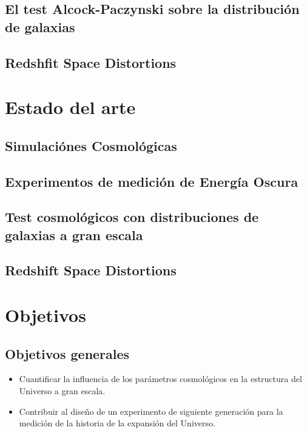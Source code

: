 \documentclass[12pt]{article}
\begin{document}
\subsection*{El test Alcock-Paczynski sobre la distribuci\'on de
  galaxias}

\subsection*{Redshfit Space Distortions}


\section{Estado del arte}

\subsection*{Simulaci\'ones Cosmol\'ogicas}

\subsection*{Experimentos de medici\'on de Energ\'ia Oscura}

\subsection*{Test cosmol\'ogicos con distribuciones de galaxias a gran
escala}

\subsection*{Redshift Space Distortions}

\section{Objetivos}

\subsection*{Objetivos generales} 

\begin{itemize}
\item  Cuantificar la influencia de los par\'ametros cosmol\'ogicos en la
  estructura del Universo a gran escala.
\item Contribuir al dise\~no de un experimento de siguiente
  generaci\'on para la medici\'on de la historia de la expansi\'on del
  Universo. 
\end{itemize}
\end{document}
